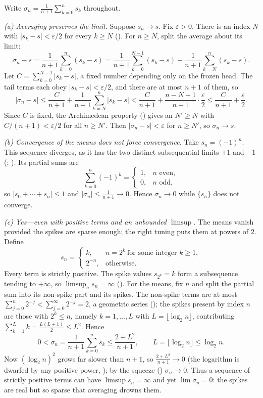 \documentclass[main.tex]{subfiles}
\begin{document}
\begin{SolutionBlue}
Write $\sigma_{n}=\frac{1}{n+1}\sum_{k=0}^{n}s_{k}$ throughout.

\emph{(a) Averaging preserves the limit.} Suppose $s_{n}\to s$. Fix $\varepsilon>0$. There is an index
$N$ with $|s_{k}-s|<\varepsilon/2$ for every $k\ge N$ (). For $n\ge N$, split the average
about its limit:
\[
\sigma_{n}-s=\frac{1}{n+1}\sum_{k=0}^{n}(s_{k}-s)
   =\frac{1}{n+1}\sum_{k=0}^{N-1}(s_{k}-s)+\frac{1}{n+1}\sum_{k=N}^{n}(s_{k}-s).
\]
Let $C=\sum_{k=0}^{N-1}|s_{k}-s|$, a fixed number depending only on the frozen head. The tail terms each
obey $|s_{k}-s|<\varepsilon/2$, and there are at most $n+1$ of them, so
\[
|\sigma_{n}-s|\le\frac{C}{n+1}+\frac{1}{n+1}\sum_{k=N}^{n}|s_{k}-s|
   <\frac{C}{n+1}+\frac{n-N+1}{n+1}\cdot\frac{\varepsilon}{2}
   \le\frac{C}{n+1}+\frac{\varepsilon}{2}.
\]
Since $C$ is fixed, the Archimedean property () gives an
$N'\ge N$ with $C/(n+1)<\varepsilon/2$ for all $n\ge N'$. Then $|\sigma_{n}-s|<\varepsilon$ for $n\ge N'$,
so $\sigma_{n}\to s$.

\emph{(b) Convergence of the means does not force convergence.} Take $s_{n}=(-1)^{n}$. This sequence
diverges, as it has the two distinct subsequential limits $+1$ and $-1$ (; ). Its partial sums are
\[
\sum_{k=0}^{n}(-1)^{k}=\begin{cases}1,& n\text{ even},\\[2pt]0,& n\text{ odd},\end{cases}
\]
so $|s_{0}+\cdots+s_{n}|\le 1$ and $|\sigma_{n}|\le\frac{1}{n+1}\to 0$. Hence $\sigma_{n}\to 0$ while
$\{s_{n}\}$ does not converge.

\emph{(c) Yes---even with positive terms and an unbounded $\limsup$.} The means vanish provided the
spikes are sparse enough; the right tuning puts them at powers of $2$. Define
\[
s_{n}=\begin{cases} k, & n=2^{k}\ \text{for some integer }k\ge 1,\\[2pt] 2^{-n}, & \text{otherwise.}\end{cases}
\]
Every term is strictly positive. The spike values $s_{2^{k}}=k$ form a subsequence tending to $+\infty$,
so $\limsup_{n}s_{n}=\infty$ (). For the means, fix $n$ and split the partial sum into its
non-spike part and its spikes. The non-spike terms are at most $\sum_{j=0}^{n}2^{-j}<\sum_{j=0}^{\infty}2^{-j}=2$,
a geometric series (); the spikes present by index $n$ are those with $2^{k}\le n$, namely
$k=1,\dots,L$ with $L=\lfloor\log_{2}n\rfloor$, contributing $\sum_{k=1}^{L}k=\tfrac{L(L+1)}{2}\le L^{2}$.
Hence
\[
0<\sigma_{n}=\frac{1}{n+1}\sum_{k=0}^{n}s_{k}\le\frac{2+L^{2}}{n+1},
\qquad L=\lfloor\log_{2}n\rfloor\le\log_{2}n .
\]
Now $(\log_{2}n)^{2}$ grows far slower than $n+1$, so $\frac{2+L^{2}}{n+1}\to 0$ (the logarithm is
dwarfed by any positive power, ); by the squeeze () $\sigma_{n}\to 0$. Thus a
sequence of strictly positive terms can have $\limsup s_{n}=\infty$ and yet $\lim\sigma_{n}=0$: the spikes
are real but so sparse that averaging drowns them.


\end{SolutionBlue}
\end{document}
